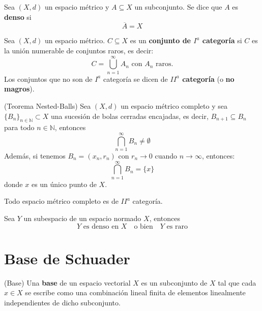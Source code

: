\documentclass[12pt]{book}
\newcommand{\tbf}{\textbf}
\newcommand{\N}{\mathbb{N}}
\begin{document}
\begin{definicion}
    Sea $(X, d)$ un espacio métrico y $A \subseteq X$ un subconjunto. Se dice que $A$ es \textbf{denso} si 
    \begin{equation*}
        \overline{A} = X
    \end{equation*}
\end{definicion}

\begin{definicion}
    Sea $(X, d)$ un espacio métrico. $C \subseteq X$ es un \textbf{conjunto de $I^a$ categoría} si $C$ es la unión numerable de conjuntos raros, es decir:
    \begin{equation*}
        C = \bigcup_{n=1}^{\infty} A_n \text{ con } A_n \text{ raros}.
    \end{equation*}
    Los conjuntos que no son de $I^a$ categoría se dicen de \textbf{$II^a$ categoría} (o \textbf{no magros}).
\end{definicion}

\begin{teo}(Teorema Nested-Balls)
    Sea $(X, d)$ un espacio métrico completo y sea $\{B_n\}_{n\in \N}\subset X$ una sucesión de bolas cerradas encajadas, es decir, $B_{n+1} \subseteq B_n$ para todo $n \in \mathbb{N}$, entonces
    \begin{equation*}
        \bigcap_{n=1}^{\infty} B_n \neq \emptyset
    \end{equation*} 
    Además, si tenemos $B_n=(x_n, r_n)$ con $r_n \to 0$ cuando $n \to \infty$, entonces:
    \begin{equation*}
        \bigcap_{n=1}^{\infty} B_n = \{x\}
    \end{equation*}
    donde $x$ es un único punto de $X$.
\end{teo}

\begin{teo}\label{teo:baire}
    Todo espacio métrico completo es de $II^a$ categoría.
\end{teo}

\begin{prop}\label{prop:denso-raro}
    Sea $Y$ un subespacio de un espacio normado $X$, entonces
    \begin{equation*}
            Y \text{ es denso en } X \quad \text{o bien} \quad Y \text{ es raro}    
    \end{equation*}
\end{prop}

\section{Base de Schuader}
\begin{definicion}(Base)
    Una \tbf{base} de un espacio vectorial $X$ es un subconjunto de $X$ tal que cada $x \in X$ se escribe como una combinación lineal finita de elementos linealmente independientes de dicho subconjunto.
\end{definicion}
\end{document}

